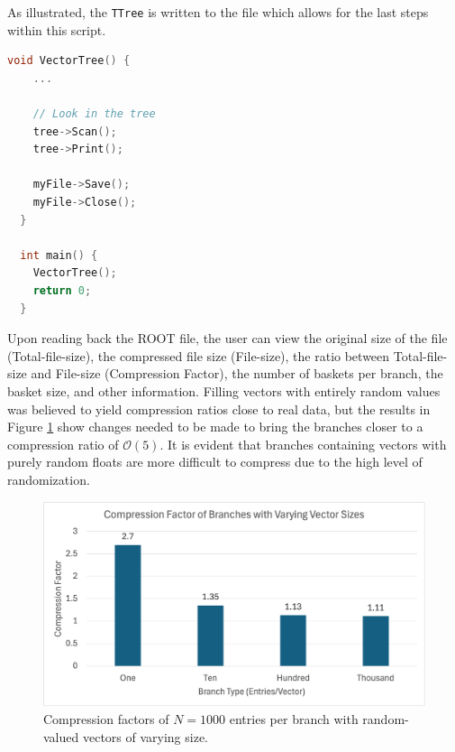 As illustrated, the \verb|TTree| is written to the file which allows for the last steps within this script. 

\begin{lstlisting}[language=C]  
  void VectorTree() {
    ...

    // Look in the tree
    tree->Scan();
    tree->Print();

    myFile->Save();
    myFile->Close();
  }

  int main() {
    VectorTree();
    return 0;
  } 
\end{lstlisting}

Upon reading back the ROOT file, the user can view the original size of the file (Total-file-size), the compressed file size (File-size), the ratio between Total-file-size and File-size (Compression Factor), the number of baskets per branch, the basket size, and other information. 
Filling vectors with entirely random values was believed to yield compression ratios close to real data, but the results in Figure \ref{fig:toymodel_compF_rndm_vectors} show changes needed to be made to bring the branches closer to a compression ratio of $\mathcal{O}(5)$.  
It is evident that branches containing vectors with purely random floats are more difficult to compress due to the high level of randomization.

\begin{figure}[h]
    \centering
    \includegraphics[width=.8\textwidth]{content/toymodel_content/branch_compfacts_nomix.png}
    \caption{Compression factors of $N=1000$ entries per branch with random-valued vectors of varying size.}
    \label{fig:toymodel_compF_rndm_vectors}
\end{figure}


